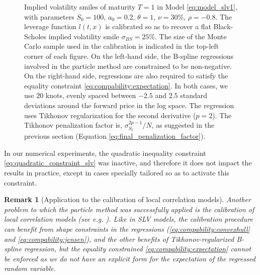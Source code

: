 \documentclass[a4paper]{article}
\newtheorem*{remark}{Remark}
\newcommand{\1}{\textbf{1}}
\newcommand{\E}{\mathbb{E}}
\begin{document}
\begin{figure}[!ht]
	\caption{Implied volatility smiles of maturity $T=1$ in Model \eqref{eq:model_slv1}, with parameters $S_0=100$, $a_0=0.2$, $\theta = 1$, $\nu = 30\%$, $\rho = -0.8$. The leverage function $l(t,x)$ is calibrated so as to recover a flat Black-Scholes implied volatility smile $\sigma_{BS} = 25\%$. The size of the Monte Carlo sample used in the calibration is indicated in the top-left corner of each figure. On the left-hand side, the B-spline regressions involved in the particle method are constrained to be non-negative. On the right-hand side, regressions are also required to satisfy the equality constraint \eqref{eq:compability:expectation}. In both cases, we use $20$ knots, evenly spaced between $-2.5$ and $2.5$ standard deviations around the forward price in the log space. The regression uses Tikhonov regularization for the second derivative ($p=2$). The Tikhonov penalization factor is, $\sigma_{S_t}^{2p-1} / N$, as suggested in the previous section (Equation \eqref{eq:final_penalization_factor}).} 
	\label{fig:recover_BS}
\end{figure}
\par \noindent In our numerical experiments, the quadratic inequality constraint \eqref{eq:quadratic_constraint_slv} was inactive, and therefore it does not impact the results in practice, except in cases specially tailored so as to activate this constraint. 
\begin{remark}[Application to the calibration of local correlation models]
Another problem to which the particle method was successfully applied is the calibration of local correlation models (see e.g. \cite{GuyonAplusB}). Like in SLV models, the calibration procedure can benefit from shape constraints in the regressions (\eqref{eq:compability:convexhull} and \eqref{eq:compability:jensen}), and the other benefits of Tikhonov-regularized B-spline regression, but the equality constrained \eqref{eq:compability:expectation} cannot be enforced as we do not have an explicit form for the expectation of the regressed random variable.
\end{remark}
\end{document}
